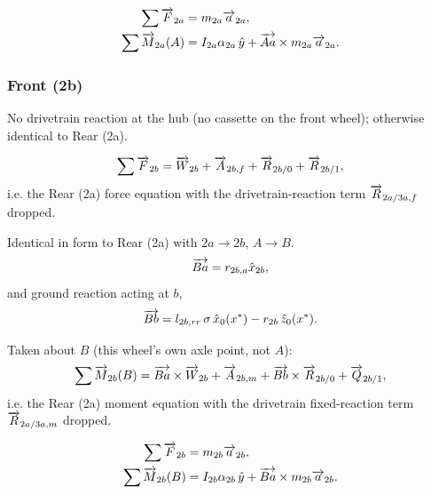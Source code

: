\begin{align}
    \sum\overrightarrow{F}_{2a} &= m_{2a}\overrightarrow{a}_{2a}, \\
    \sum\overrightarrow{M}_{2a}(A) &= I_{2a}\alpha_{2a}\,\hat y + \overrightarrow{Aa}\times m_{2a}\overrightarrow{a}_{2a}.
\end{align}

\subsubsection{Front (2b)}
No drivetrain reaction at the hub (no cassette on the front wheel); otherwise identical to Rear (2a).

\begin{equation}
    \sum \overrightarrow{F}_{2b} = \overrightarrow{W}_{2b} + \overrightarrow{A}_{2b,f} + \overrightarrow{R}_{2b/0} + \overrightarrow{R}_{2b/1},
\end{equation}
i.e. the Rear (2a) force equation with the drivetrain-reaction term $\overrightarrow{R}_{2a/3a,f}$ dropped.

Identical in form to Rear (2a) with $2a\to2b$, \textbf{$A\to B$}.
\begin{equation}
    \overrightarrow{Ba} = r_{2b,a}\hat{x}_{2b},
\end{equation}
and ground reaction acting at $b$,
\begin{equation}
    \overrightarrow{Bb} = l_{2b,rr}\,\sigma\,\hat x_0(x^*) - r_{2b}\,\hat z_0(x^*).
\end{equation}

Taken about $B$ (this wheel's own axle point, not $A$):
\begin{equation}
    \sum \overrightarrow{M}_{2b}(B) = \overrightarrow{Ba} \times \overrightarrow{W}_{2b} + \overrightarrow{A}_{2b,m} + \overrightarrow{Bb} \times \overrightarrow{R}_{2b/0} + \overrightarrow{Q}_{2b/1},
\end{equation}
i.e. the Rear (2a) moment equation with the drivetrain fixed-reaction term $\overrightarrow{R}_{2a/3a,m}$ dropped.

\begin{align}
    \sum\overrightarrow{F}_{2b} &= m_{2b}\overrightarrow{a}_{2b}, \\
    \sum\overrightarrow{M}_{2b}(B) &= I_{2b}\alpha_{2b}\,\hat y + \overrightarrow{Ba}\times m_{2b}\overrightarrow{a}_{2b}.
\end{align}
